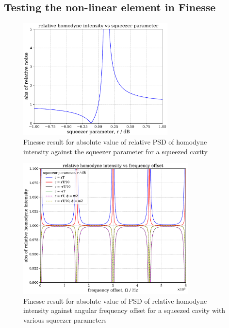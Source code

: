 \documentclass[aps,pra,superscriptaddress,reprint,nofootinbib]{revtex4-1}
\begin{document}
\subsection{Testing the non-linear element in Finesse}

\begin{figure}
	\begin{center}
	\includegraphics[width=0.7\textwidth]{figures/pykat_relative_qhd_vs_r.pdf}
	\end{center}
	\caption{Finesse result for absolute value of relative PSD of homodyne intensity against the squeezer parameter for a squeezed cavity}
	\label{fig:pykat_relative_qhd_vs_r}
\end{figure}

\begin{figure}
	\begin{center}
	\includegraphics[width=0.8\textwidth]{figures/pykat_relative_qhd_vs_freq.pdf}
	\end{center}
	\caption{Finesse result for absolute value of PSD of relative homodyne intensity against angular frequency offset for a squeezed cavity with various squeezer parameters}
	\label{fig:pykat_relative_qhd_vs_freq}
\end{figure}
\end{document}
